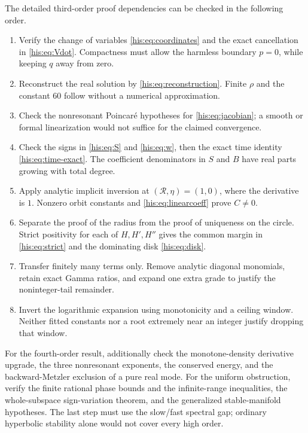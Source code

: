 \documentclass[11pt]{article}
\theoremstyle{remark}\newtheorem{remark}[theorem]{Remark}
\numberwithin{equation}{section}
\begin{document}
The detailed third-order proof dependencies can be checked in the following order.
\begin{enumerate}
 \item Verify the change of variables \eqref{his:eq:coordinates} and the exact cancellation in \eqref{his:eq:Vdot}. Compactness must allow the harmless boundary $p=0$, while keeping $q$ away from zero.
 \item Reconstruct the real solution by \eqref{his:eq:reconstruction}. Finite $\rho$ and the constant $60$ follow without a numerical approximation.
 \item Check the nonresonant Poincar\'e hypotheses for \eqref{his:eq:jacobian}; a smooth or formal linearization would not suffice for the claimed convergence.
 \item Check the signs in \eqref{his:eq:S} and \eqref{his:eq:w}, then the exact time identity \eqref{his:eq:time-exact}. The coefficient denominators in $S$ and $B$ have real parts growing with total degree.
 \item Apply analytic implicit inversion at $(\mathcal R,\eta)=(1,0)$, where the derivative is $1$. Nonzero orbit constants and \eqref{his:eq:linearcoeff} prove $C\ne0$.
 \item Separate the proof of the radius from the proof of uniqueness on the circle. Strict positivity for each of $H,H',H''$ gives the common margin in \eqref{his:eq:strict} and the dominating disk \eqref{his:eq:disk}.
 \item Transfer finitely many terms only. Remove analytic diagonal monomials, retain exact Gamma ratios, and expand one extra grade to justify the noninteger-tail remainder.
 \item Invert the logarithmic expansion using monotonicity and a ceiling window. Neither fitted constants nor a root extremely near an integer justify dropping that window.
\end{enumerate}

For the fourth-order result, additionally check the monotone-density derivative upgrade, the three nonresonant exponents, the conserved energy, and the backward-Metzler exclusion of a pure real mode. For the uniform obstruction, verify the finite rational phase bounds and the infinite-range inequalities, the whole-subspace sign-variation theorem, and the generalized stable-manifold hypotheses. The last step must use the slow/fast spectral gap; ordinary hyperbolic stability alone would not cover every high order.



\end{document}
